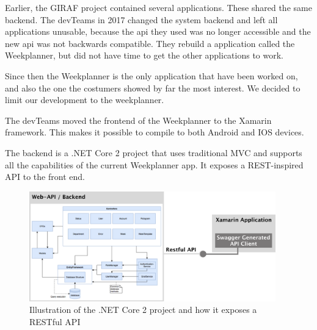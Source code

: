 Earlier, the GIRAF project contained several applications. These shared the same backend. The \glspl{devTeam} in 2017 changed the system backend\cite{SW608F18} and left all applications unusable, because the \gls{api} they used was no longer accessible and the new \gls{api} was not backwards compatible. They rebuild a application called the Weekplanner, but did not have time to get the other applications to work. 

Since then the Weekplanner is the only application that have been worked on, and also the one the costumers showed by far the most interest. We decided to limit our development to the weekplanner. 

The \glspl{devTeam} moved the frontend of the Weekplanner to the Xamarin framework. This makes it possible to compile to both Android and IOS devices.

The backend is a .NET Core 2 project that uses traditional MVC and supports all the capabilities of the current Weekplanner app. It exposes a REST-inspired API to the front end.
\begin{figure}[H]
        \begin{center}
            \includegraphics[width=0.95\textwidth]{figures/RestAPIFigure.pdf}
        \end{center}
        \caption{Illustration of the .NET Core 2 project and how it exposes a RESTful API}
        \label{fig:RestAPIFigure}
\end{figure}

